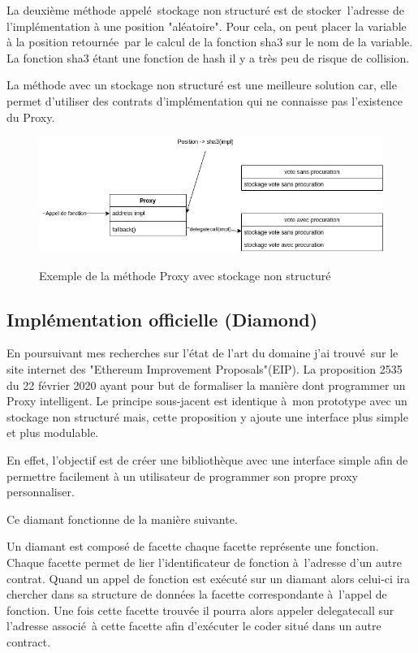 La deuxième méthode appelé stockage non structuré est de stocker l'adresse de l'implémentation à une position "aléatoire".
Pour cela, on peut placer la variable à la position retournée par le calcul de la fonction sha3 sur le nom de la variable.
La fonction sha3 étant une fonction de hash il y a très peu de risque de collision.

La méthode avec un stockage non structuré est une meilleure solution car, elle permet d'utiliser des contrats d'implémentation 
qui ne connaisse pas l'existence du Proxy.

\begin{figure}[h!]
  \caption{Exemple de la méthode Proxy avec stockage non structuré}
  \includegraphics[scale=0.5]{proxy_unstructured.jpg}
  \centering 
  \label{fig:proxy_structuré}
\end{figure}

\subsection{Implémentation officielle (Diamond)}

En poursuivant mes recherches sur l'état de l'art du domaine j'ai trouvé sur le site internet des 
"Ethereum Improvement Proposals"(EIP). La proposition 2535 du 22 février 2020 ayant pour but de formaliser
la manière dont programmer un Proxy intelligent. Le principe sous-jacent est identique à mon prototype
avec un stockage non structuré mais, cette proposition y ajoute une interface plus simple et plus modulable.

En effet, l'objectif est de créer une bibliothèque avec une interface simple afin de permettre facilement à un
utilisateur de programmer son propre proxy personnaliser.

Ce diamant fonctionne de la manière suivante.

Un diamant est composé de facette chaque facette représente une fonction. Chaque facette permet de lier l'identificateur
de fonction à l'adresse d'un autre contrat. Quand un appel de fonction est exécuté sur un diamant alors celui-ci ira chercher
dans sa structure de données la facette correspondante à l'appel de fonction. Une fois cette facette trouvée il pourra alors
appeler delegatecall sur l'adresse associé à cette facette afin d'exécuter le coder situé dans un autre contract.

